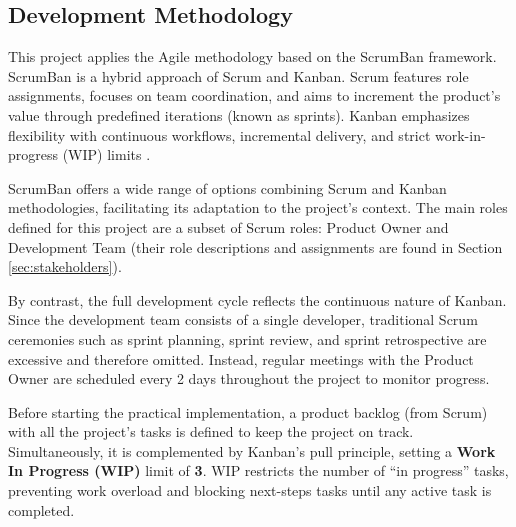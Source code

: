 \subsection{Development Methodology}
\label{sec:methodology}

This project applies the Agile methodology based on the ScrumBan framework. ScrumBan is a hybrid approach of Scrum and Kanban. Scrum features role assignments, focuses on team coordination, and aims to increment the product's value through predefined iterations (known as sprints). Kanban emphasizes flexibility with continuous workflows, incremental delivery, and strict work-in-progress (WIP) limits \cite{scrum-and-kanban}. 

ScrumBan offers a wide range of options combining Scrum and Kanban methodologies, facilitating its adaptation to the project's context. The main roles defined for this project are a subset of Scrum roles: Product Owner and Development Team (their role descriptions and assignments are found in Section \ref{sec:stakeholders}).

By contrast, the full development cycle reflects the continuous nature of Kanban. Since the development team consists of a single developer, traditional Scrum ceremonies such as sprint planning, sprint review, and sprint retrospective are excessive and therefore omitted. Instead, regular meetings with the Product Owner are scheduled every 2 days throughout the project to monitor progress.

Before starting the practical implementation, a product backlog (from Scrum) with all the project's tasks is defined to keep the project on track.  Simultaneously, it is complemented by Kanban's pull principle, setting a \textbf{Work In Progress (WIP)} limit of \textbf{3}. WIP restricts the number of “in progress” tasks, preventing work overload and blocking next-steps tasks until any active task is completed.
